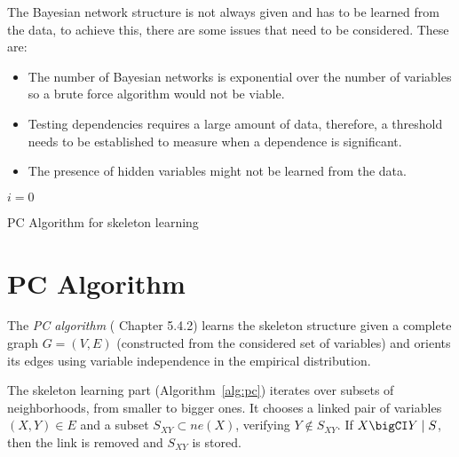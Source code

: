 
The Bayesian network structure is not always given and has to be learned from the data, to achieve this, there are some issues that need to be considered. These are:
\begin{itemize}\setlength{\itemsep}{0.15cm}
  \item The number of Bayesian networks is exponential over the number of variables so a brute force algorithm would not be viable.
  \item Testing dependencies requires a large amount of data, therefore, a threshold needs to be established to measure when a dependence is significant.
  \item The presence of hidden variables might not be learned from the data.
\end{itemize}


\begin{algorithm}[t]
  \SetAlgoLined{}
  \(i = 0\)\;
  \caption{PC Algorithm for skeleton learning}\label{alg:pc}
\end{algorithm}

\section{PC Algorithm}

The \emph{PC algorithm} (\cite{spirtes2000causation} Chapter 5.4.2) learns the skeleton structure given a complete graph \(G=(V,E)\) (constructed from the considered set of variables) and orients its edges using variable independence in the empirical distribution.

The skeleton learning part (Algorithm~\ref{alg:pc}) iterates over subsets of neighborhoods, from smaller to bigger ones. It chooses a linked pair of variables \((X,Y) \in E\) and
a subset \(S_{XY} \subset ne(X)\), verifying \(Y \notin S_{XY}\). If \(X \bigCI Y \mid S\), then the link is removed and \(S_{XY}\) is stored.

